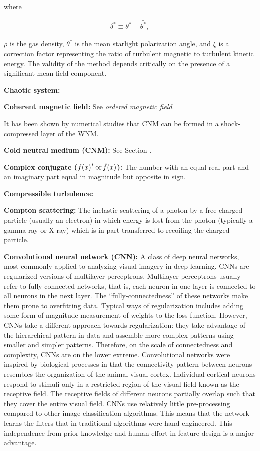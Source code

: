 \documentclass[a4paper,10pt]{article}
\begin{document}
{\noindent}where

\begin{align*}
    \delta^* \equiv \theta^* - \bar{\theta^*},
\end{align*}

{\noindent}$\rho$ is the gas density, $\theta^*$ is the mean starlight polarization angle, and $\xi$ is a correction factor representing the ratio of turbulent magnetic to turbulent kinetic energy. The validity of the method depends critically on the presence of a significant mean field component.

{\noindent}\textbf{Chaotic system:}

{\noindent}\textbf{Coherent magnetic field:} See \textit{ordered magnetic field}.

{\noindent}It has been shown by numerical studies that CNM can be formed in a shock-compressed layer of the WNM.

{\noindent}\textbf{Cold neutral medium (CNM):} See Section \label{sec:ism}.

{\noindent}\textbf{Complex conjugate (${f(x)}^*\,{\rm or}\,\bar{f}(x)$):} The number with an equal real part and an imaginary part equal in magnitude but opposite in sign.

{\noindent}\textbf{Compressible turbulence:}

{\noindent}\textbf{Compton scattering:} The inelastic scattering of a photon by a free charged particle (usually an electron) in which energy is lost from the photon (typically a gamma ray or X-ray) which is in part transferred to recoiling the charged particle.

{\noindent}\textbf{Convolutional neural network (CNN):} A class of deep neural networks, most commonly applied to analyzing visual imagery in deep learning. CNNs are regularized versions of multilayer perceptrons. Multilayer perceptrons usually refer to fully connected networks, that is, each neuron in one layer is connected to all neurons in the next layer. The ``fully-connectedness'' of these networks make them prone to overfitting data. Typical ways of regularization includes adding some form of magnitude measurement of weights to the loss function. However, CNNs take a different approach towards regularization: they take advantage of the hierarchical pattern in data and assemble more complex patterns using smaller and simpler patterns. Therefore, on the scale of connectedness and complexity, CNNs are on the lower extreme. Convolutional networks were inspired by biological processes in that the connectivity pattern between neurons resembles the organization of the animal visual cortex. Individual cortical neurons respond to stimuli only in a restricted region of the visual field known as the receptive field. The receptive fields of different neurons partially overlap such that they cover the entire visual field. CNNs use relatively little pre-processing compared to other image classification algorithms. This means that the network learns the filters that in traditional algorithms were hand-engineered. This independence from prior knowledge and human effort in feature design is a major advantage.
\end{document}
